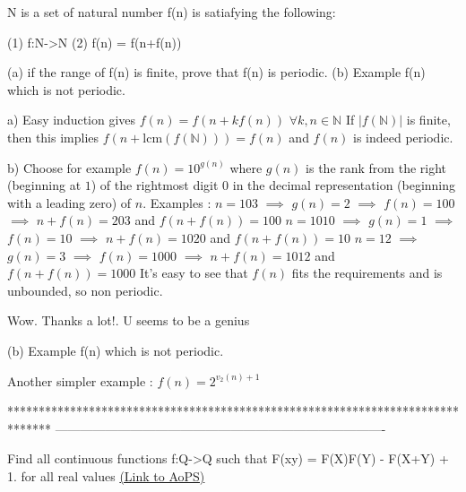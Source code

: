 \begin{solution}
	\begin{tcolorbox}N is a set of natural number
f(n) is satiafying the following:

   (1) f:N->N 
   (2) f(n) = f(n+f(n))

(a) if the range of f(n) is finite, prove that f(n) is periodic.
(b) Example f(n) which is not periodic.\end{tcolorbox}
a) Easy induction gives $f(n)=f(n+kf(n))$ $\forall k,n\in\mathbb N$
If $|f(\mathbb N)|$ is finite, then this implies $f(n+\text{lcm}(f(\mathbb N)))=f(n)$ and $f(n)$ is indeed periodic.

b) Choose for example $f(n)=10^{g(n)}$ where $g(n)$ is the rank from the right (beginning at $1$) of the rightmost digit $0$ in the decimal representation (beginning with a leading zero) of $n$.
Examples :
$n=103$ $\implies$ $g(n)=2$ $\implies$ $f(n)=100$ $\implies$ $n+f(n)=203$ and $f(n+f(n))=100$
$n=1010$ $\implies$ $g(n)=1$ $\implies$ $f(n)=10$ $\implies$ $n+f(n)=1020$ and $f(n+f(n))=10$
$n=12$ $\implies$ $g(n)=3$ $\implies$ $f(n)=1000$ $\implies$ $n+f(n)=1012$ and $f(n+f(n))=1000$
It's easy to see that $f(n)$ fits the requirements and is unbounded, so non periodic.
\end{solution}



\begin{solution}
	Wow. Thanks a lot!. U seems to be a genius
\end{solution}



\begin{solution}
	\begin{tcolorbox}(b) Example f(n) which is not periodic.\end{tcolorbox}
Another simpler example : $f(n)=2^{v_2(n)+1}$
\end{solution}
*******************************************************************************
-------------------------------------------------------------------------------

\begin{problem}
	Find all continuous functions f:Q->Q such that F(xy) = F(X)F(Y) - F(X+Y) + 1. for all real values
	\flushright \href{https://artofproblemsolving.com/community/c6h611080}{(Link to AoPS)}
\end{problem}



